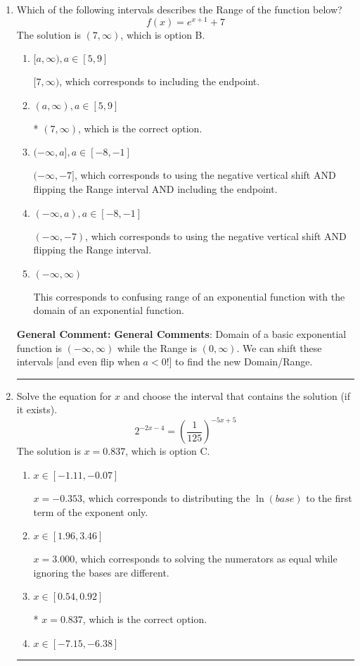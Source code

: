 \documentclass{extbook}[14pt]
\newcommand{\litem}[1]{\item #1

\rule{\textwidth}{0.4pt}}
\begin{document}
\begin{enumerate}\litem{
Which of the following intervals describes the Range of the function below?
\[ f(x) = e^{x+1}+7 \]
The solution is \( (7, \infty) \), which is option B.\begin{enumerate}[label=\Alph*.]
\item \( [a, \infty), a \in [5, 9] \)

$[7, \infty)$, which corresponds to including the endpoint.
\item \( (a, \infty), a \in [5, 9] \)

* $(7, \infty)$, which is the correct option.
\item \( (-\infty, a], a \in [-8, -1] \)

$(-\infty, -7]$, which corresponds to using the negative vertical shift AND flipping the Range interval AND including the endpoint.
\item \( (-\infty, a), a \in [-8, -1] \)

$(-\infty, -7)$, which corresponds to using the negative vertical shift AND flipping the Range interval.
\item \( (-\infty, \infty) \)

This corresponds to confusing range of an exponential function with the domain of an exponential function.
\end{enumerate}

\textbf{General Comment:} \textbf{General Comments}: Domain of a basic exponential function is $(-\infty, \infty)$ while the Range is $(0, \infty)$. We can shift these intervals [and even flip when $a<0$!] to find the new Domain/Range.
}
\litem{
Solve the equation for $x$ and choose the interval that contains the solution (if it exists).
\[ 2^{-2x-4} = \left(\frac{1}{125}\right)^{-5x+5} \]
The solution is \( x = 0.837 \), which is option C.\begin{enumerate}[label=\Alph*.]
\item \( x \in [-1.11, -0.07] \)

$x = -0.353$, which corresponds to distributing the $\ln(base)$ to the first term of the exponent only.
\item \( x \in [1.96, 3.46] \)

$x = 3.000$, which corresponds to solving the numerators as equal while ignoring the bases are different.
\item \( x \in [0.54, 0.92] \)

* $x = 0.837$, which is the correct option.
\item \( x \in [-7.15, -6.38] \)


\end{enumerate}}
\end{enumerate}
\end{document}
